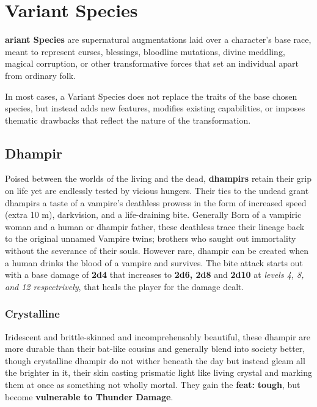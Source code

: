 \documentclass{apotheosis-book}
\begin{document}
\newpage

\section{Variant Species}
\textbf{ariant Species} are supernatural augmentations laid over a character’s base race, meant to represent curses, blessings, bloodline mutations, divine meddling, magical corruption, or other transformative forces that set an individual apart from ordinary folk.

In most cases, a Variant Species does not replace the traits of the base chosen species, but instead adds new features, modifies existing capabilities, or imposes thematic drawbacks that reflect the nature of the transformation.

\subsection{Dhampir}
Poised between the worlds of the living and the dead, \textbf{dhampirs} retain their grip on life yet are endlessly tested by vicious hungers. Their ties to the undead grant dhampirs a taste of a vampire’s deathless prowess in the form of increased speed (extra 10 m), darkvision, and a life-draining bite. Generally Born of a vampiric woman and a human or dhampir father, these deathless trace their lineage back to the original unnamed Vampire twins; brothers who saught out immortality without the severance of their souls. However rare, dhampir can be created when a human drinks the blood of a vampire and survives. The bite attack starts out with a base damage of \textbf{2d4} that increases to \textbf{2d6, 2d8} and \textbf{2d10} at \textit{levels 4, 8, and 12 respectrively}, that heals the player for the damage dealt.

\subsubsection{Crystalline}
Iridescent and brittle-skinned and incomprehensably beautiful, these dhampir are more durable than their bat-like cousins and generally blend into society better, though crystalline dhampir do not wither beneath the day but instead gleam all the brighter in it, their skin casting prismatic light like living crystal and marking them at once as something not wholly mortal. They gain the \textbf{feat: }\textbf{tough}, but become \textbf{vulnerable to Thunder Damage}.
\end{document}
